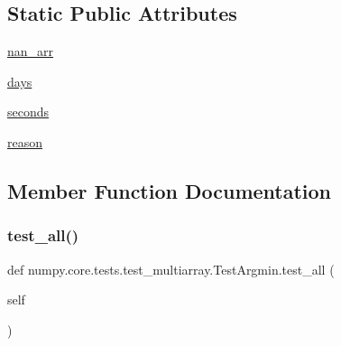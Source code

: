 \subsection*{Static Public Attributes}
\begin{DoxyCompactItemize}
\item 
\hyperlink{classnumpy_1_1core_1_1tests_1_1test__multiarray_1_1TestArgmin_af9280500d6aaac414294e6468cc3c820}{nan\+\_\+arr}
\item 
\hyperlink{classnumpy_1_1core_1_1tests_1_1test__multiarray_1_1TestArgmin_af8f91f139b1460dac85e4c8bdb9de456}{days}
\item 
\hyperlink{classnumpy_1_1core_1_1tests_1_1test__multiarray_1_1TestArgmin_ac9495859728406514f63b59c7daf7a7f}{seconds}
\item 
\hyperlink{classnumpy_1_1core_1_1tests_1_1test__multiarray_1_1TestArgmin_a6696e9daf1ee9fe76b718cd5be678935}{reason}
\end{DoxyCompactItemize}


\subsection{Member Function Documentation}
\mbox{\label{classnumpy_1_1core_1_1tests_1_1test__multiarray_1_1TestArgmin_a6a777253c5245fd9dbb12d6ecf2bb1da}} 
\subsubsection{\texorpdfstring{test\+\_\+all()}{test\_all()}}
{\footnotesize\ttfamily def numpy.\+core.\+tests.\+test\+\_\+multiarray.\+Test\+Argmin.\+test\+\_\+all (\begin{DoxyParamCaption}\item[{}]{self }\end{DoxyParamCaption})}

\mbox{\label{classnumpy_1_1core_1_1tests_1_1test__multiarray_1_1TestArgmin_a13b6c9078ea9cc81696e3005bfc963a1}} 
